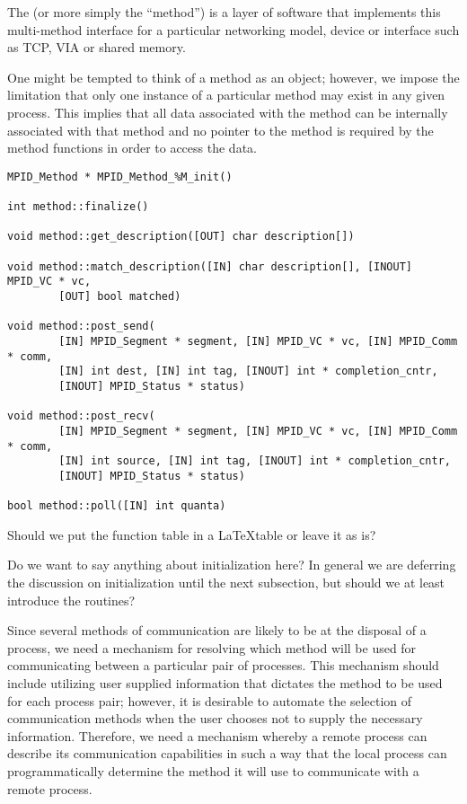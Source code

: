 The  (or more simply the ``method'') is a layer of
software that implements this multi-method interface for a particular
networking model, device or interface such as TCP, VIA or shared memory.

\begin{discussion}
  One might be tempted to think of a method as an object; however, we impose
  the limitation that only one instance of a particular method may exist in any
  given process.  This implies that all data associated with the method can be
  internally associated with that method and no pointer to the method is
  required by the method functions in order to access the data.
\end{discussion}

\begin{verbatim}
MPID_Method * MPID_Method_%M_init()

int method::finalize()

void method::get_description([OUT] char description[])

void method::match_description([IN] char description[], [INOUT] MPID_VC * vc,
        [OUT] bool matched)

void method::post_send(
        [IN] MPID_Segment * segment, [IN] MPID_VC * vc, [IN] MPID_Comm * comm,
        [IN] int dest, [IN] int tag, [INOUT] int * completion_cntr,
        [INOUT] MPID_Status * status)

void method::post_recv(
        [IN] MPID_Segment * segment, [IN] MPID_VC * vc, [IN] MPID_Comm * comm,
        [IN] int source, [IN] int tag, [INOUT] int * completion_cntr,
        [INOUT] MPID_Status * status)

bool method::poll([IN] int quanta)
\end{verbatim}

\begin{cmt}[BRT]
Should we put the function table in a \LaTeX table or leave it as is?
\end{cmt}

\begin{cmt}[BRT]
  Do we want to say anything about initialization here?  In general we are
  deferring the discussion on initialization until the next subsection, but
  should we at least introduce the routines?
\end{cmt}

Since several methods of communication are likely to be at the disposal of a
process, we need a mechanism for resolving which method will be used for
communicating between a particular pair of processes.  This mechanism should
include utilizing user supplied information that dictates the method to be used
for each process pair; however, it is desirable to automate the selection of
communication methods when the user chooses not to supply the necessary
information.  Therefore, we need a mechanism whereby a remote process can
describe its communication capabilities in such a way that the local process
can programmatically determine the method it will use to communicate with a
remote process.

